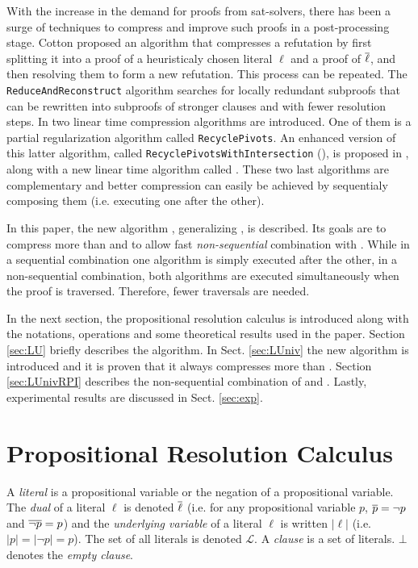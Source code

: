\documentclass{llncs}
\begin{document}
With the increase in the demand for proofs from sat-solvers, there has been a surge of techniques to
compress and improve such proofs in a post-processing stage.
Cotton \cite{CottonSplit} proposed an
algorithm that compresses a refutation by first splitting it into a proof of a heuristicaly
chosen literal $\ell$ and a proof of $\overline{\ell}$, and then resolving them to form a new refutation. This process can be repeated.
The \texttt{ReduceAndReconstruct} algorithm \cite{RedRec} searches for locally redundant subproofs that can be rewritten into subproofs of stronger clauses and with fewer resolution steps. In \cite{RP} two linear time compression
algorithms are introduced. One of them is a partial regularization algorithm called
\texttt{RecyclePivots}.  An enhanced version of this latter algorithm, called
\texttt{RecyclePivotsWithIntersection} ({\RPI}), is proposed in \cite{LURPI}, along with a new
linear time algorithm called {\LowerUnits}.  These two last algorithms are complementary and 
better compression can easily be achieved by sequentialy composing them (i.e. executing one after the other).

In this paper, the new algorithm {\LowerUnivalents}, generalizing {\LowerUnits}, is described. Its goals are to compress more than {\LowerUnits} and to allow fast \emph{non-sequential}  combination with {\RPI}. While in a sequential combination one algorithm is simply executed after the other, in a non-sequential combination, both algorithms are executed simultaneously when the proof is traversed. Therefore, fewer traversals are needed.

In the next section, the propositional resolution calculus is introduced along with the notations, operations and some theoretical results used in the paper. Section \ref{sec:LU} briefly describes the 
{\LowerUnits} algorithm. In Sect. \ref{sec:LUniv} the new algorithm {\LowerUnivalents} is introduced and it is proven that it always compresses more than {\LowerUnits}. Section \ref{sec:LUnivRPI}
describes the non-sequential combination of {\LowerUnivalents} and {\RPI}. Lastly,
experimental results are discussed in Sect. \ref{sec:exp}.



\section{Propositional Resolution Calculus}

A \emph{literal} is a propositional variable or the negation of a propositional variable. The
\emph{dual} of a literal $\ell$ is denoted $\overline{\ell}$ (i.e. for any propositional variable $p$,
$\overline{p} = \neg p$ and $\overline{\neg p} = p$) and the \emph{underlying variable} of a literal $\ell$
is written $|\ell|$ (i.e. $|p| = |\neg p| = p$). The set of all literals is denoted $\mathcal{L}$. A
\emph{clause} is a set of literals. $\bot$ denotes the \emph{empty clause}.
\end{document}
